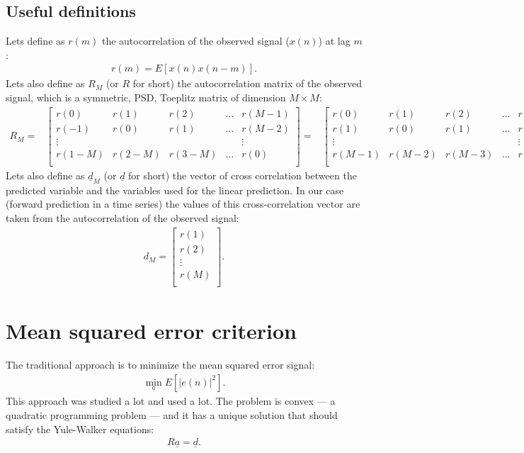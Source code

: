 \documentclass[journal,onecolumn]{IEEEtran}
\begin{document}
\subsection{Useful definitions}
Lets define as $r(m)$ the autocorrelation of the observed signal ($x(n)$) at lag $m$:
\begin{align*}
r(m) = E[x(n)x(n-m)].
\end{align*}
Lets also define as $R_M$ (or $R$ for short) the autocorrelation matrix of the observed signal, which is a symmetric, PSD, Toeplitz matrix of dimension $M \times M$:
\begin{align*}
R_M = &
\begin{bmatrix}
r(0) & r(1) & r(2) & \ldots & r(M-1) \\
r(-1) & r(0) & r(1) & \ldots & r(M-2) \\
\vdots & & & & \vdots \\
r(1-M) & r(2-M) & r(3-M) & \ldots & r(0) \\
\end{bmatrix}
 = &
\begin{bmatrix}
r(0) & r(1) & r(2) & \ldots & r(M-1) \\
r(1) & r(0) & r(1) & \ldots & r(M-2) \\
\vdots & & & & \vdots \\
r(M-1) & r(M-2) & r(M-3) & \ldots & r(0) \\
\end{bmatrix}.
\end{align*}
Lets also define as $\underline{d}_M$ (or $\underline{d}$ for short) the vector of cross correlation between the predicted variable and the variables used for the linear prediction. In our case (forward prediction in a time series) the values of this cross-correlation vector are taken from the autocorrelation of the observed signal:
\begin{align*}
d_M =
\begin{bmatrix}
r(1) \\
r(2) \\
\vdots \\
r(M) \\
\end{bmatrix}.
\end{align*}

\section{Mean squared error criterion}
The traditional approach is to minimize the mean squared error signal:
\begin{align*}
\min\limits_{\underline{a}}E[|e(n)|^2].
\end{align*}
This approach was studied a lot and used a lot. The problem is convex --- a quadratic programming problem --- and it has a unique solution that should satisfy the Yule-Walker equations:
\begin{align*}
R \underline{a} = \underline{d}.
\end{align*}
\end{document}
